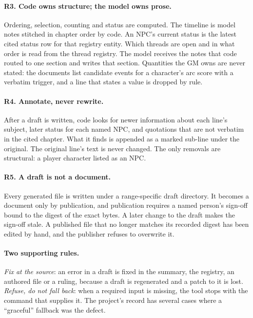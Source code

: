 \documentclass[11pt]{article}
\begin{document}
\paragraph{R3. Code owns structure; the model owns prose.} Ordering, selection, counting
and status are computed. The timeline is model notes stitched in chapter order by code.
An NPC's current status is the latest cited status row for that registry entity. Which
threads are open and in what order is read from the thread registry. The model receives
the notes that code routed to one section and writes that section. Quantities the GM
owns are never stated: the documents list candidate events for a character's arc score
with a verbatim trigger, and a line that states a value is dropped by rule.

\paragraph{R4. Annotate, never rewrite.} After a draft is written, code looks for newer
information about each line's subject, later status for each named NPC, and quotations
that are not verbatim in the cited chapter. What it finds is appended as a marked
sub-line under the original. The original line's text is never changed. The only
removals are structural: a player character listed as an NPC.

\paragraph{R5. A draft is not a document.} Every generated file is written under a
range-specific draft directory. It becomes a document only by publication, and
publication requires a named person's sign-off bound to the digest of the exact bytes.
A later change to the draft makes the sign-off stale. A published file that no longer
matches its recorded digest has been edited by hand, and the publisher refuses to
overwrite it.

\paragraph{Two supporting rules.} \emph{Fix at the source}: an error in a draft is fixed
in the summary, the registry, an authored file or a ruling, because a draft is
regenerated and a patch to it is lost. \emph{Refuse, do not fall back}: when a required
input is missing, the tool stops with the command that supplies it. The project's record
has several cases where a ``graceful'' fallback was the defect.
\end{document}
